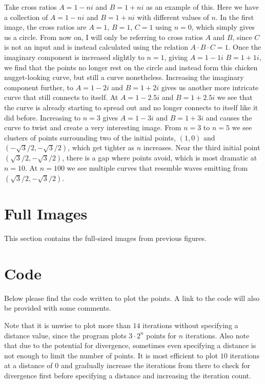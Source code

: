 \documentclass[12pt,a4paper,reqno,parskip=full]{amsart}
\numberwithin{equation}{section}
\theoremstyle{plain}
\theoremstyle{definition}
\begin{document}
Take cross ratios $A=1-ni$ and $B=1+ni$ as an example of this. Here we have a collection of $A=1-ni$ and $B=1+ni$ with different values of $n$. In the first image, the cross ratios are $A=1$, $B=1$, $C=1$ using $n=0$, which simply gives us a circle. From now on, I will only be referring to cross ratios $A$ and $B$, since $C$ is not an input and is instead calculated using the relation $A\cdot B\cdot C=1$. Once the imaginary component is increased slightly to $n=1$, giving $A=1-1i$ $B=1+1i$, we find that the points no longer rest on the circle and instead form this chicken nugget-looking curve, but still a curve nonetheless. Increasing the imaginary component further, to $A=1-2i$ and $B=1+2i$ gives us another more intricate curve that still connects to itself. At $A=1-2.5i$ and $B=1+2.5i$ we see that the curve is already starting to spread out and no longer connects to itself like it did before. Increasing to $n=3$ gives $A=1-3i$ and $B=1+3i$ and causes the curve to twist and create a very interesting image. From $n=3$ to $n=5$ we see clusters of points surrounding two of the initial points, $(1,0)$ and $(-\sqrt3/2,-\sqrt3/2)$, which get tighter as $n$ increases. Near the third initial point $(\sqrt3/2,-\sqrt3/2)$, there is a gap where points avoid, which is most dramatic at $n=10$. At $n=100$ we see multiple curves that resemble waves emitting from $(\sqrt3/2,-\sqrt3/2)$.



\newpage
\appendix
\appendixpage
\addappheadtotoc

\section{Full Images}

This section contains the full-sized images from previous figures.

\section{Code}
Below please find the code written to plot the points. A link to the code will also be provided with some comments.

Note that it is unwise to plot more than $14$ iterations without specifying a distance value, since the program plots $3\cdot2^n$ points for $n$ iterations. Also note that due to the potential for divergence, sometimes even specifying a distance is not enough to limit the number of points. It is most efficient to plot $10$ iterations at a distance of $0$ and gradually increase the iterations from there to check for divergence first before specifying a distance and increasing the iteration count. 


\end{document}
